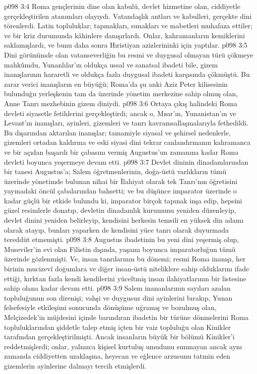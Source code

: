 \vs p098 3:4 Roma gençlerinin dine olan kabulü, devlet hizmetine olan, ciddiyetle gerçekleştirilen atanımları olayıydı. Vatandaşlık antları ve kabulleri, gerçekte dini törenlerdi. Latin topluluklar; tapınakları, sunakları ve mabetleri muhafaza ettiler; ve bir kriz durumunda kâhinlere danışırlardı. Onlar, kahramanların kemiklerini saklamışlardı, ve bunu daha sonra Hıristiyan azizlerininki için yaptılar.
\vs p098 3:5 Dini görünümde olan vatanseverliğin bu resmi ve duygusal olmayan türü çökmeye mahkûmdu, Yunanlılar’ın oldukça ussal ve sanatsal ibadeti bile, gizem inanışlarının hararetli ve oldukça fazla duygusal ibadeti karşısında çökmüştü. Bu zarar verici inanışların en büyüğü; Roma’da şu anki Aziz Peter kilisesinin bulunduğu yerleşkenin tam da üzerinde yönetim merkezine sahip olmuş olan, Anne Tanrı mezhebinin gizem diniydi.
\vs p098 3:6 Ortaya çıkış halindeki Roma devleti siyasetle fetihlerini gerçekleştirdi; ancak o, Mısır’ın, Yunanistan’ın ve Levant’ın inanışları, ayinleri, gizemleri ve tanrı kavramsallaşmalarıyla fethedildi. Bu dışarından aktarılan inanışlar; tamamiyle siyasal ve şehirsel nedenlerle, gizemleri ortadan kaldırma ve eski siyasi dini tekrar canlandırmanın kahramanca ve bir açıdan başarılı bir çabasını vermiş Augustus’un zamanına kadar Roma devleti boyunca yeşermeye devam etti.
\vs p098 3:7 Devlet dininin dinadamlarından bir tanesi Augustus’a; Salem öğretmenlerinin, doğa\hyp{}üstü varlıkların tümü üzerinde yönetimde bulunan nihai bir İlahiyat olarak tek Tanrı’nın öğretisini yaymadaki öncül çabalarından bahsetti; ve bu düşünce imparator üzerinde o kadar güçlü bir etkide bulundu ki, imparator birçok tapınak inşa edip, hepsini güzel resimlerle donatıp, devletin dinadamlık kurumunu yeniden düzenleyip, devlet dinini yeniden belirleyip, kendisini herkesin temsili en yüksek din adamı olarak atayıp, bunları yaparken de kendisini yüce tanrı olarak duyurmada tereddüt etmemişti.
\vs p098 3:8 Augustus ibadetinin bu yeni dini yeşermiş olup, Museviler’in evi olan Filistin dışında, yaşamı boyunca imparatorluğun tümü üzerinde gözlenmişti. Ve, insan tanrılarının bu dönemi; resmi Roma inanışı, her birinin mucizevî doğumlara ve diğer insan\hyp{}üstü niteliklere sahip olduklarını ifade ettiği, kırktan fazla kendi kendilerini yüceltmiş insan ilahiyatlarının bir listesine sahip olana kadar devam etti.
\vs p098 3:9 Salem inananlarının sayıları azalan topluluğunun son direnişi; vahşi ve duygusuz dini ayinlerini bırakıp, Yunan felsefesiyle etkileşimi sonucunda dönüşüme uğramış ve bozulmuş olan, Melçizedek’in müjdesini içinde barındıran ibadetin bir türüne dönmelerini Roma topluluklarından şiddetle talep etmiş içten bir vaiz topluluğu olan Kinikler tarafından gerçekleştirilmişti. Ancak insanların büyük bir bölümü Kinikler’i reddetmişlerdi; onlar, yalnızca kişisel kurtuluş umudunu sunmayan ancak aynı zamanda ciddiyetten uzaklaşma, heyecan ve eğlence arzusunu tatmin eden gizemlerin ayinlerine dalmayı tercih etmişlerdi.
